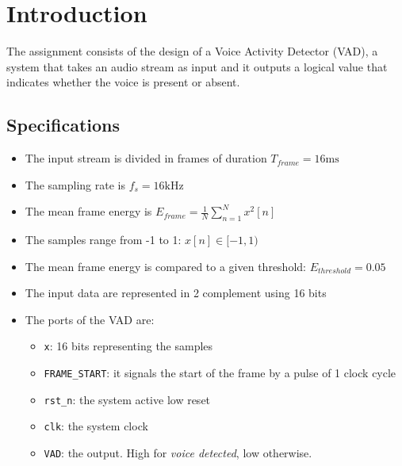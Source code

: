 \section{Introduction}


The assignment consists of the design of a Voice Activity Detector (VAD), a
system that takes an audio stream as input and it outputs a logical value that
indicates whether the voice is present or absent.

\subsection{Specifications}
\begin{itemize}
  \item The input stream is divided in frames of duration
  $T_{frame} = 16\si{\milli\second}$
  \item The sampling rate is $f_s = 16 \si{\kilo\hertz}$
  \item The mean frame energy is $ E_{frame} = \frac{1}{N}\sum_{n=1}^N x^2[n] $
  \item The samples range from -1 to 1: $x[n] \in [-1, 1)$
  \item The mean frame energy is compared to a given threshold:
  $ E_{threshold} = 0.05 $
  \item The input data are represented in 2 complement using 16 bits
  \item The ports of the VAD are:
  \begin{itemize}
    \item \texttt{x}: 16 bits representing the samples
    \item \texttt{FRAME\_START}: it signals the start of the frame by
    a pulse of 1 clock cycle
    \item \texttt{rst\_n}: the system active low reset
    \item \texttt{clk}: the system clock
    \item \texttt{VAD}: the output. High for \textit{voice detected},
    low otherwise.
  \end{itemize}
\end{itemize}

